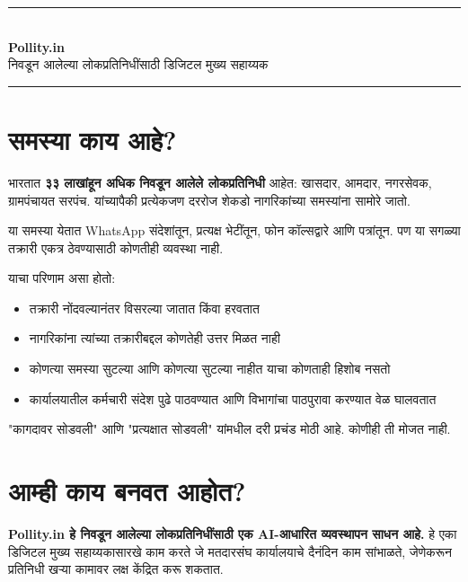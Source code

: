 \documentclass[11pt, a4paper]{article}
\begin{document}
\begin{center}
  {\color{pollityblue}\rule{\linewidth}{1.5pt}}\\[0.5em]
  {\Huge\bfseries\color{pollityblue}\textenglish{Pollity.in}}\\[0.3em]
  {\large निवडून आलेल्या लोकप्रतिनिधींसाठी डिजिटल मुख्य सहाय्यक}\\[0.3em]
  {\color{pollityblue}\rule{\linewidth}{1.5pt}}
\end{center}

\vspace{0.8em}

\section{समस्या काय आहे?}

भारतात \textbf{३३ लाखांहून अधिक निवडून आलेले लोकप्रतिनिधी} आहेत: खासदार, आमदार, नगरसेवक, ग्रामपंचायत सरपंच. यांच्यापैकी प्रत्येकजण दररोज शेकडो नागरिकांच्या समस्यांना सामोरे जातो.

या समस्या येतात \textenglish{WhatsApp} संदेशांतून, प्रत्यक्ष भेटींतून, फोन कॉल्सद्वारे आणि पत्रांतून. पण या सगळ्या तक्रारी एकत्र ठेवण्यासाठी कोणतीही व्यवस्था नाही.

याचा परिणाम असा होतो:

\begin{itemize}[leftmargin=1.5em, itemsep=3pt]
  \item तक्रारी नोंदवल्यानंतर विसरल्या जातात किंवा हरवतात
  \item नागरिकांना त्यांच्या तक्रारीबद्दल कोणतेही उत्तर मिळत नाही
  \item कोणत्या समस्या सुटल्या आणि कोणत्या सुटल्या नाहीत याचा कोणताही हिशोब नसतो
  \item कार्यालयातील कर्मचारी संदेश पुढे पाठवण्यात आणि विभागांचा पाठपुरावा करण्यात वेळ घालवतात
\end{itemize}

"कागदावर सोडवली" आणि "प्रत्यक्षात सोडवली" यांमधील दरी प्रचंड मोठी आहे. कोणीही ती मोजत नाही.

\section{आम्ही काय बनवत आहोत?}

\begin{tcolorbox}[colback=pollityblue!8, colframe=pollityblue, sharp corners, boxrule=0.6pt]
\textbf{\textenglish{Pollity.in} हे निवडून आलेल्या लोकप्रतिनिधींसाठी एक \textenglish{AI}-आधारित व्यवस्थापन साधन आहे.}
हे एका डिजिटल मुख्य सहाय्यकासारखे काम करते जे मतदारसंघ कार्यालयाचे दैनंदिन काम सांभाळते, जेणेकरून प्रतिनिधी खऱ्या कामावर लक्ष केंद्रित करू शकतात.
\end{tcolorbox}
\end{document}

